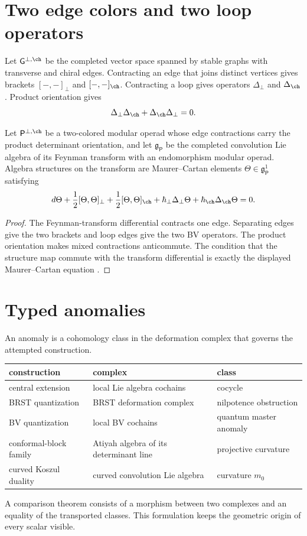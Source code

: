 \chapter{Two edge colors and two loop operators}
Let $\mathsf G^{\perp,\ch}$ be the completed vector space spanned by stable graphs with transverse and chiral edges. Contracting an edge that joins distinct vertices gives brackets $[-,-]_\perp$ and $[-,-]_{\ch}$. Contracting a loop gives operators $\Delta_\perp$ and $\Delta_{\ch}$. Product orientation gives
\[
 \Delta_\perp\Delta_{\ch}+\Delta_{\ch}\Delta_\perp=0.
\]

\begin{theorem}
Let $\mathsf P^{\perp,\ch}$ be a two-colored modular operad whose edge contractions carry the product determinant orientation, and let $\mathfrak g_{\mathsf P}$ be the completed convolution Lie algebra of its Feynman transform with an endomorphism modular operad. Algebra structures on the transform are Maurer--Cartan elements $\Theta\in\mathfrak g_{\mathsf P}^1$ satisfying
\[
 d\Theta+\frac12[\Theta,\Theta]_\perp
 +\frac12[\Theta,\Theta]_{\ch}
 +\hbar_\perp\Delta_\perp\Theta
 +\hbar_{\ch}\Delta_{\ch}\Theta=0.
\]
\end{theorem}
\begin{proof}
The Feynman-transform differential contracts one edge. Separating edges give the two brackets and loop edges give the two BV operators. The product orientation makes mixed contractions anticommute. The condition that the structure map commute with the transform differential is exactly the displayed Maurer--Cartan equation \cite{GetzlerKapranov}.
\end{proof}

\chapter{Typed anomalies}
An anomaly is a cohomology class in the deformation complex that governs the attempted construction.
\begin{center}
\begin{tabularx}{\textwidth}{@{}>{\raggedright\arraybackslash}p{}>{\raggedright\arraybackslash}X>{\raggedright\arraybackslash}p{}@{}}
\toprule
construction&complex&class\\ \midrule
central extension&local Lie algebra cochains&cocycle\\
BRST quantization&BRST deformation complex&nilpotence obstruction\\
BV quantization&local BV cochains&quantum master anomaly\\
conformal-block family&Atiyah algebra of its determinant line&projective curvature\\
curved Koszul duality&curved convolution Lie algebra&curvature $m_0$\\
\bottomrule
\end{tabularx}
\end{center}
A comparison theorem consists of a morphism between two complexes and an equality of the transported classes. This formulation keeps the geometric origin of every scalar visible.

